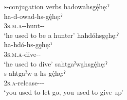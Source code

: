 \ea\label{ex:habitvarex2} \textsc{s}-conjugation verbs
\ea hadowahsgę́hę:ˀ\\
\gll ha-d-owad-hs-gę́hę:ˀ\\
 \textsc{3s.m.a}-{\semireflexive}-hunt-{\habitual}-{\past}\\
\glt `he used to be a hunter'
\ex hahdóhsgę̱hę:ˀ\\
\gll ha-hdó-hs-gę̱hę:ˀ\\
 \textsc{3s.m.a}-dive-{\habitual}-{\past}\\
\glt `he used to dive'
\ex sahtgaˀwa̱hsgę́hę:ˀ\\
\gll s-ahtgaˀw-a̱-hs-gę́hę:ˀ\\
 \textsc{2s.a}-release-{\joinerA}-{\habitual}-{\past}\\
\glt `you used to let go, you used to give up'
\z
\z

